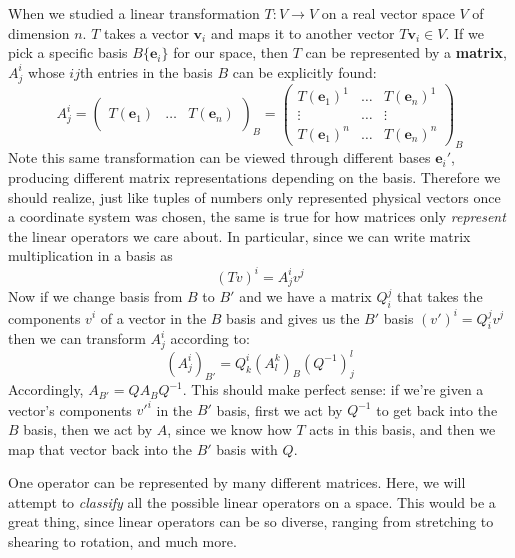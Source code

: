 \begin{appendices}
When we studied a linear transformation $T: V \rightarrow V$ on a real vector space $V$ of dimension $n$. $T$ takes a vector $\mathbf v_i$ and maps it to another vector $T\mathbf v_i \in V$. If we pick a specific basis $B \{ \mathbf e_i \}$ for our space, then $T$ can be represented by a \textbf{matrix}, $A^i_j$ whose $ij$th entries in the basis $B$ can be explicitly found: 
	\begin{equation}
		A^i_j = \begin{pmatrix}
			& & \\
			T(\mathbf e_1) & \dots & T(\mathbf e_n)\\
			& &
		\end{pmatrix}_B
		=\begin{pmatrix}
			T(\mathbf e_1)^1 & \dots & T(\mathbf e_n)^1 \\
			\vdots & \dots & \vdots\\
			T(\mathbf e_1)^n & \dots & T(\mathbf e_n)^n
		\end{pmatrix}_B
	\end{equation}
	Note this same transformation can be viewed through different bases $\mathbf e_i'$, producing different matrix representations depending on the basis. Therefore we should realize, just like tuples of numbers only represented physical vectors once a coordinate system was chosen, the same is true for how matrices only \emph{represent} the linear operators we care about. In particular, since we can write matrix multiplication in a basis as
	\begin{equation}
		(Tv)^i = A^i_j v^j
	\end{equation}
	Now if we change basis from $B$ to $B'$ and we have a matrix $Q_i^j$ that takes the components $v^i$ of a vector in the $B$ basis and gives us the $B'$ basis $(v')^i = Q_i^j v^j$ then we can transform $A^i_j$ according to:
	\begin{equation}
		(A^i_j)_{B'} = Q^i_k (A^k_l)_B (Q^{-1})^l_j 
	\end{equation}
	Accordingly, $A_{B'} = Q A_B Q^{-1}$. This should make perfect sense: if we're given a vector's components ${v'}^i$ in the $B'$ basis, first we act by $Q^{-1}$ to get back into the $B$ basis, then we act by $A$, since we know how $T$ acts in this basis, and then we map that vector back into the $B'$ basis with $Q$.
	
	One operator can be represented by many different matrices. Here, we will attempt to \emph{classify} all the possible linear operators on a space. This would be a great thing, since linear operators can be so diverse, ranging from stretching to shearing to rotation, and much more. 
	

\end{appendices}
